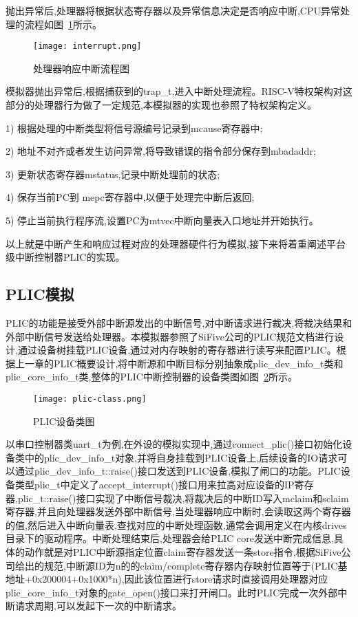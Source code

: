 抛出异常后,处理器将根据状态寄存器以及异常信息决定是否响应中断,CPU异常处理的流程如图~\ref{fig:interrupt}所示。
\begin{figure}[H]
    \centering
    \texttt{[image: interrupt.png]}
    \caption{处理器响应中断流程图}
    \label{fig:interrupt}
\end{figure}

模拟器抛出异常后,根据捕获到的trap\_t,进入中断处理流程。RISC-V特权架构对这部分的处理器行为做了一定规范,本模拟器的实现也参照了特权架构定义。


1) 根据处理的中断类型将信号源编号记录到mcause寄存器中;


2) 地址不对齐或者发生访问异常,将导致错误的指令部分保存到mbadaddr;


3) 更新状态寄存器mstatus,记录中断处理前的状态;


4) 保存当前PC到 mepc寄存器中,以便于处理完中断后返回;


5) 停止当前执行程序流,设置PC为mtvec中断向量表入口地址并开始执行。


以上就是中断产生和响应过程对应的处理器硬件行为模拟,接下来将着重阐述平台级中断控制器PLIC的实现。


\subsection{PLIC模拟}

PLIC的功能是接受外部中断源发出的中断信号,对中断请求进行裁决,将裁决结果和外部中断信号发送给处理器。本模拟器参照了SiFive公司的PLIC规范文档进行设计,通过设备树挂载PLIC设备,通过对内存映射的寄存器进行读写来配置PLIC。根据上一章的PLIC概要设计,将中断源和中断目标分别抽象成plic\_dev\_info\_t类和plic\_core\_info\_t类,整体的PLIC中断控制器的设备类图如图~\ref{fig:plic-class}所示。
\begin{figure}[H]
    \centering
    \texttt{[image: plic-class.png]}
    \caption{PLIC设备类图}
    \label{fig:plic-class}
\end{figure}
以串口控制器类uart\_t为例,在外设的模拟实现中,通过connect\_plic()接口初始化设备类中的plic\_dev\_info\_t对象,并将自身挂载到PLIC设备上,后续设备的IO请求可以通过plic\_dev\_info\_t::raise()接口发送到PLIC设备,模拟了闸口的功能。PLIC设备类型plic\_t中定义了accept\_interrupt()接口用来拉高对应设备的IP寄存器,plic\_t::raise()接口实现了中断信号裁决,将裁决后的中断ID写入mclaim和sclaim寄存器,并且向处理器发送外部中断信号,当处理器响应中断时,会读取这两个寄存器的值,然后进入中断向量表,查找对应的中断处理函数,通常会调用定义在内核drives目录下的驱动程序。中断处理结束后,处理器会给PLIC core发送中断完成信息,具体的动作就是对PLIC中断源指定位置claim寄存器发送一条store指令,根据SiFive公司给出的规范,中断源ID为n的的claim/complete寄存器内存映射位置等于(PLIC基地址+0x200004+0x1000*n),因此该位置进行store请求时直接调用处理器对应plic\_core\_info\_t对象的gate\_open()接口来打开闸口。此时PLIC完成一次外部中断请求周期,可以发起下一次的中断请求。





